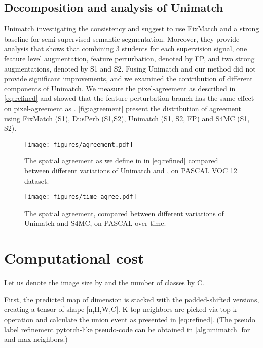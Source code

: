 \documentclass{article}
\renewcommand{\cite}[1]{\citep{#1}}
\begin{document}
\subsection{Decomposition and analysis of Unimatch}\label{appendix:decompose_unimatch}
Unimatch \cite{unimatch} investigating the consistency and suggest to use FixMatch \cite{sohn2020fixmatch} and a strong baseline for semi-supervised semantic segmentation. Moreover, they provide analysis that shows that combining 3 students for each supervision signal, one feature level augmentation, feature perturbation, denoted by FP, and two strong augmentations, denoted by S1 and S2.
Fusing Unimatch and our method did not provide significant improvements, and we examined the contribution of different components of Unimatch.   
We measure the pixel-agreement as described in \cref{eq:refined} and showed that the feature perturbation branch has the same effect on pixel-agreement as \methodname{}.
\cref{fig:agreement} present the distribution of agreement using FixMatch (S1), DusPerb (S1,S2), Unimatch (S1, S2, FP) and S4MC (S1, S2).


\begin{figure*}
    \centering
    \begin{subfigure}{0.49\linewidth}
    \texttt{[image: figures/agreement.pdf]} 
        \caption{The spatial agreement as we define in in \ref{eq:refined} compared between different variations of Unimatch and \methodname{}, on PASCAL VOC 12 dataset.}
    \end{subfigure}
    \hfill
    \begin{subfigure}{0.49\linewidth}
 	\texttt{[image: figures/time\_agree.pdf]} 
        \caption{The spatial agreement, compared between different variations of Unimatch \cite{unimatch} and S4MC, on PASCAL over time.}
    \end{subfigure}
\label{fig:agreement}
\end{figure*}

\section{Computational cost}

Let us denote the image size by  and the number of classes by C.

First, the predicted map of dimension  is stacked with the padded-shifted versions, creating a tensor of shape [n,H,W,C]. K top neighbors are picked via top-k operation and calculate the union event as presented in \cref{eq:refined}.
(The pseudo label refinement pytorch-like pseudo-code can be obtained in \cref{alg:unimatch} for  and  max neighbors.)
\end{document}
